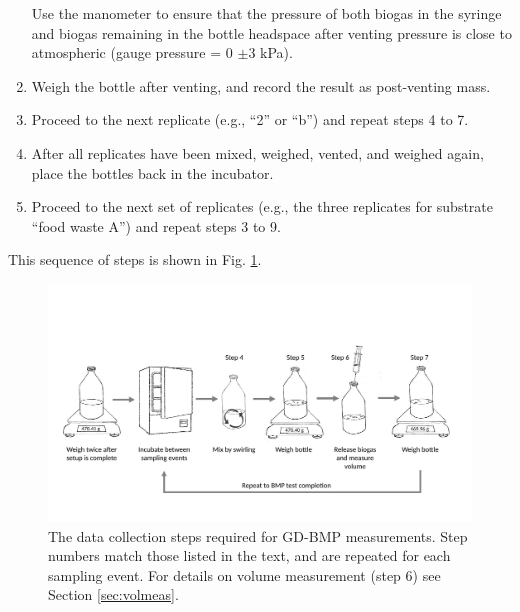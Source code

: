 \documentclass[]{article}
\begin{document}
\begin{enumerate}
      Use the manometer to ensure that the pressure of both biogas in the syringe and biogas remaining in the bottle headspace after venting pressure is close to atmospheric (gauge pressure = 0 $\pm3 $ kPa).
    \item Weigh the bottle after venting, and record the result as post-venting mass. 
    \item Proceed to the next replicate (e.g., ``2'' or ``b'') and repeat steps 4 to 7.
    \item After all replicates have been mixed, weighed, vented, and weighed again, place the bottles back in the incubator.
    \item Proceed to the next set of replicates (e.g., the three replicates for substrate ``food waste A'') and repeat steps 3 to 9.
\end{enumerate}

This sequence of steps is shown in Fig. \ref{fig:steps}.

\begin{figure}[ht]
  \includegraphics[width=\textwidth]{figs/GD_steps.pdf}
  \caption{The data collection steps required for GD-BMP measurements. Step numbers match those listed in the text, and are repeated for each sampling event. For details on volume measurement (step 6) see Section \ref{sec:volmeas}.}
  \label{fig:steps}
\end{figure}
\end{document}
